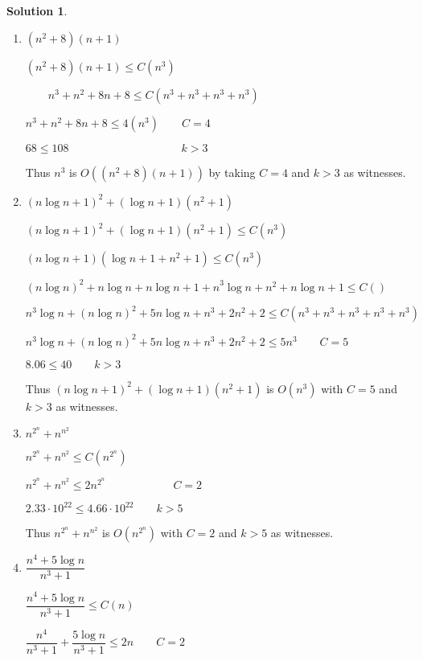 \documentclass{article}
\theoremstyle{definition}
\newtheorem*{solution}{Solution}
\begin{document}
\begin{solution}
\item \begin{enumerate}
\item $(n^{2}+8)(n+1)$

\qquad $(n^{2}+8)(n+1)\leq C(n^{3})$

$\qquad n^{3}+n^{2}+8n+8\leq C(n^{3}+n^{3}+n^{3}+n^{3})$

\qquad $n^{3}+n^{2}+8n+8\leq 4(n^{3})\qquad C=4$

\qquad $68\leq 108\qquad \qquad \qquad \qquad \qquad k>3$

\qquad Thus $n^{3}$ is $O((n^{2}+8)(n+1))$ by taking $C=4$ and $k>3$ as
witnesses.

\item $(n\log {n}+1)^{2}+(\log {n}+1)(n^{2}+1)$

\qquad $(n\log {n}+1)^{2}+(\log {n}+1)(n^{2}+1)\leq C(n^{3})$

\qquad $(n\log {n}+1)(\log {n}+1+n^{2}+1)\leq C(n^{3})$

\qquad $(n\log {n})^{2}+n\log {n+}n\log {n+1+n}^{3}\log {n}+n^{2}+n\log
n+1\leq C()$

\qquad $n^{3}\log n+(n\log {n})^{2}+5n\log n+n^{3}+2n^{2}+2\leq
C(n^{3}+n^{3}+n^{3}+n^{3}+n^{3})$

\qquad $n^{3}\log n+(n\log {n})^{2}+5n\log n+n^{3}+2n^{2}+2\leq 5n^{3}\qquad
C=5$

\qquad $8.06\leq 40\qquad k>3$

\qquad Thus $(n\log {n}+1)^{2}+(\log {n}+1)(n^{2}+1)$ is $O(n^{3})$ with $C=5
$ and $k>3$ as witnesses.

\qquad 

\item $n^{2^{n}}+n^{n^{2}}$

\qquad $n^{2^{n}}+n^{n^{2}}\leq C(n^{2^{n}})$

\qquad $n^{2^{n}}+n^{n^{2}}\leq 2n^{2^{n}}\qquad \qquad \qquad C=2$

\qquad $2.33\cdot 10^{22}\leq 4.66\cdot 10^{22}\qquad k>5$

\qquad Thus $n^{2^{n}}+n^{n^{2}}$ is $O(n^{2^{n}})$ with $C=2$ and $k>5$ as
witnesses.

\item $\dfrac{n^{4}+5\log {n}}{n^{3}+1}$

\qquad $\dfrac{n^{4}+5\log {n}}{n^{3}+1}\leq C(n)$

\qquad $\dfrac{n^{4}}{n^{3}+1}+\dfrac{5\log {n}}{n^{3}+1}\leq 2n\qquad C=2$


\end{enumerate}
\end{solution}
\end{document}
